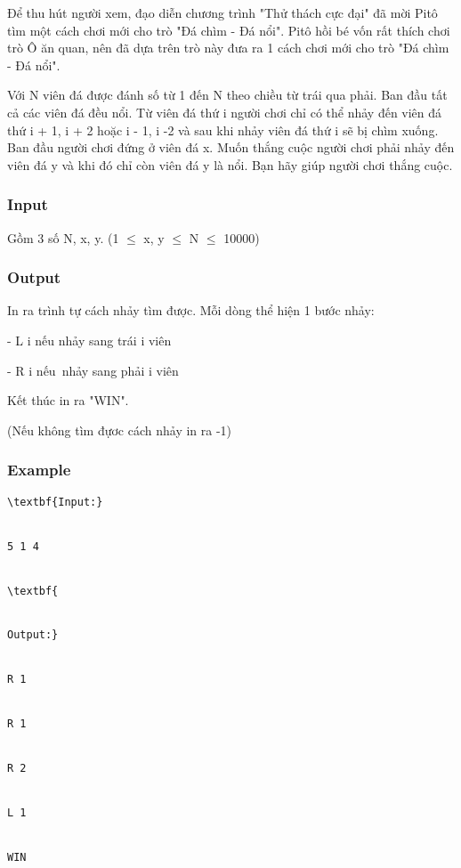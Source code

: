 



   Để thu hút người xem, đạo diễn chương trình "Thử thách cực đại" đã mời Pitô tìm một cách chơi mới cho trò "Đá chìm - Đá nổi". Pitô hồi bé vốn rất thích chơi trò Ô ăn quan, nên đã dựa trên trò này đưa ra 1 cách chơi mới cho trò "Đá chìm - Đá nổi".  

   Với N viên đá được đánh số từ 1 đến N theo chiều từ trái qua phải. Ban đầu tất cả các viên đá đều nổi. Từ viên đá thứ i người chơi chỉ có thể nhảy đến viên đá thứ i + 1, i + 2 hoặc i - 1, i -2 và sau khi nhảy viên đá thứ i sẽ bị chìm xuống. Ban đầu người chơi đứng ở viên đá x. Muốn thắng cuộc người chơi phải nhảy đến viên đá y và khi đó chỉ còn viên đá y là nổi. Bạn hãy giúp người chơi thắng cuộc.  



\subsubsection{   Input  }

   Gồm 3 số N, x, y. (1 $\le$  x, y  $\le$  N  $\le$  10000)  

\subsubsection{   Output  }

   In ra trình tự cách nhảy tìm được. Mỗi dòng thể hiện 1 bước nhảy:   


   - L i  nếu nhảy sang trái i viên   


   - R i  nếu nhảy sang phải i viên   


   Kết thúc in ra "WIN".   


   (Nếu không tìm đựơc cách nhảy in ra -1)   










\subsubsection{   Example  }


\begin{verbatim}
\textbf{Input:}


5 1 4


\textbf{


Output:}


R 1


R 1


R 2


L 1


WIN








\end{verbatim}
